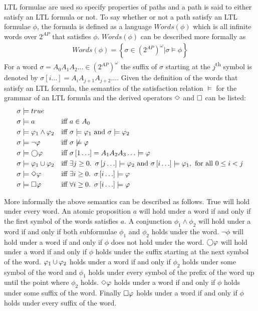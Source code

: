 LTL formulae are used so specify properties of paths and a path is said to either satisfy an LTL formula or not.  To say whether or not a path satisfy an LTL formulae $\phi$, the formula is defined as a language $Words(\phi)$ which is all infinite words over $2^{AP}$ that satisfies $\phi$. $Words(\phi)$ can be described more formally as
\begin{align*}
    Words(\phi) = \left\{ \sigma \in \left( 2^{AP} \right)^\omega | \sigma \models \phi \right\}
\end{align*}
For a word $\sigma = A_0 A_1 A_2 \ldots \in \left( 2^{AP} \right)^\omega$ the suffix of $\sigma$ starting at the $j$\textsuperscript{th} symbol is denoted by $\sigma \left[ i \ldots \right] = A_i A_{j+1} A_{j+2} \ldots$. Given the definition of the words that satisfy an LTL formula, the semantics of the satisfaction relation $\models$ for the grammar of an LTL formula and the derived operators $\Diamond$ and $\square$ can be listed:
\begin{align}
    \sigma &\models true                && \label{eq:sem-true}\\
    \sigma &\models a                   &\text{iff }& a \in A_0 \\
    \sigma &\models \varphi_1 \land \varphi_2 &\text{iff }& \sigma \models \varphi_1 \text{ and } \sigma \models \varphi_2 \\
    \sigma &\models \lnot \varphi          &\text{iff }& \sigma \not\models \varphi\\
    \sigma &\models \bigcirc \varphi             &\text{iff }& \sigma\left[1\ldots\right] = A_1 A_2 A_3\ldots \models \varphi\\
    \sigma &\models \varphi_1 \cup \varphi_2    &\text{iff }& \exists j \geq 0.\enskip \sigma\left[j\ldots\right] \models \varphi_2 \text{ and } \sigma\left[i\ldots\right] \models \varphi_1, \text{ for all } 0 \leq i < j \\
    \sigma &\models \Diamond \varphi             &\text{iff }& \exists i \geq 0.\enskip \sigma\left[i\ldots\right] \models \varphi \\
    \sigma &\models \square \varphi             &\text{iff }& \forall i \geq 0.\enskip \sigma\left[i\ldots\right] \models \varphi \label{eq:sem-always}
\end{align}

More informally the above semantics can be described as follows. True will hold under every word. An atomic proposition $a$ will hold under a word if and only if the first symbol of the words satisfies $a$. A conjunction $\phi_1 \land \phi_2$ will hold under a word if and only if both subformulae $\phi_1$ and $\phi_2$ holds under the word. $\lnot \phi$ will hold under a word if and only if $\phi$ does not hold under the word. $\bigcirc\varphi$ will hold under a word if and only if $\phi$ holds under the suffix starting at the next symbol of the word. $\varphi_1 \cup \varphi_2$ holds under a word if and only if $\phi_2$ holds under some symbol of the word and $\phi_1$ holds under every symbol of the prefix of the word up until the point where $\phi_2$ holds. $\Diamond \varphi$ holds under a word if and only if $\phi$ holds under some suffix of the word. Finally $\square \varphi$ holds under a word if and only if $\phi$ holds under every suffix of the word.

